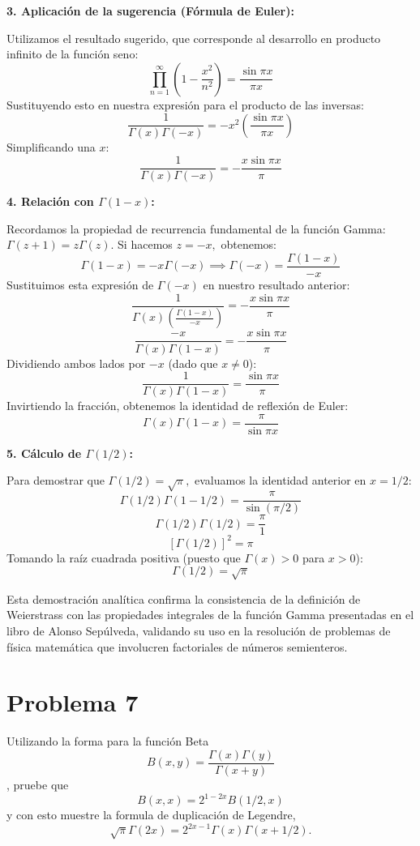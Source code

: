 \documentclass[a4paper]{article}
\begin{document}
\textbf{3. Aplicación de la sugerencia (Fórmula de Euler):}

Utilizamos el resultado sugerido, que corresponde al desarrollo en producto infinito de la función seno:
$$ \prod_{n=1}^{\infty} \left( 1 - \frac{x^2}{n^2} \right) = \frac{\sin \pi x}{\pi x} $$
Sustituyendo esto en nuestra expresión para el producto de las inversas:
$$ \frac{1}{\Gamma(x) \Gamma(-x)} = -x^2 \left( \frac{\sin \pi x}{\pi x} \right) $$
Simplificando una $x$:
$$ \frac{1}{\Gamma(x) \Gamma(-x)} = - \frac{x \sin \pi x}{\pi} $$

\textbf{4. Relación con $\Gamma(1-x)$:}

Recordamos la propiedad de recurrencia fundamental de la función Gamma: $\Gamma(z+1) = z \Gamma(z).$ Si hacemos $z = -x,$ obtenemos:
$$ \Gamma(1-x) = -x \Gamma(-x) \implies \Gamma(-x) = \frac{\Gamma(1-x)}{-x} $$
Sustituimos esta expresión de $\Gamma(-x)$ en nuestro resultado anterior:
$$ \frac{1}{\Gamma(x) \left( \frac{\Gamma(1-x)}{-x} \right)} = - \frac{x \sin \pi x}{\pi} $$
$$ \frac{-x}{\Gamma(x) \Gamma(1-x)} = - \frac{x \sin \pi x}{\pi} $$
Dividiendo ambos lados por $-x$ (dado que $x \neq 0$):
$$ \frac{1}{\Gamma(x) \Gamma(1-x)} = \frac{\sin \pi x}{\pi} $$
Invirtiendo la fracción, obtenemos la identidad de reflexión de Euler:
$$ \Gamma(x) \Gamma(1-x) = \frac{\pi}{\sin \pi x} $$

\textbf{5. Cálculo de $\Gamma(1/2)$:}

Para demostrar que $\Gamma(1/2) = \sqrt{\pi},$ evaluamos la identidad anterior en $x = 1/2$:
$$ \Gamma(1/2) \Gamma(1 - 1/2) = \frac{\pi}{\sin (\pi/2)} $$
$$ \Gamma(1/2) \Gamma(1/2) = \frac{\pi}{1} $$
$$ [\Gamma(1/2)]^2 = \pi $$
Tomando la raíz cuadrada positiva (puesto que $\Gamma(x) > 0$ para $x > 0$):
$$ \Gamma(1/2) = \sqrt{\pi} $$

Esta demostración analítica confirma la consistencia de la definición de Weierstrass con las propiedades integrales de la función Gamma presentadas en el libro de Alonso Sepúlveda, validando su uso en la resolución de problemas de física matemática que involucren factoriales de números semienteros.


\section{Problema 7}
Utilizando la forma para la función Beta $$B(x, y) = \frac{\Gamma(x)\Gamma(y)}{\Gamma(x+y)}$$, pruebe que $$B(x, x) = 2^{1-2x}B(1/2, x)$$ y con esto muestre la formula de duplicación de Legendre, $$\sqrt{\pi}\Gamma(2x) = 2^{2x-1}\Gamma(x)\Gamma(x+ 1/2) .$$
\end{document}
